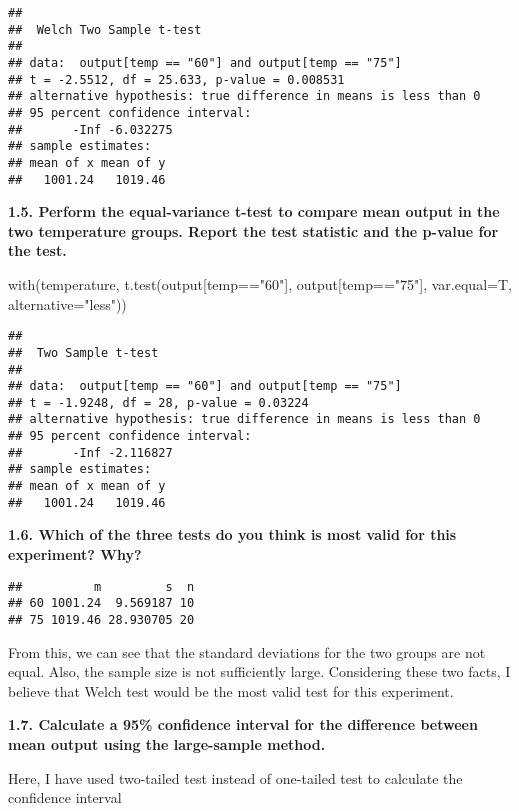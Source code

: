 \documentclass[
]{article}
\newenvironment{Shaded}{\begin{snugshade}}{\end{snugshade}}
\newcommand{\AttributeTok}[1]{\textcolor[rgb]{0.77,0.63,0.00}{#1}}
\newcommand{\FunctionTok}[1]{\textcolor[rgb]{0.00,0.00,0.00}{#1}}
\newcommand{\NormalTok}[1]{#1}
\newcommand{\SpecialCharTok}[1]{\textcolor[rgb]{0.00,0.00,0.00}{#1}}
\newcommand{\StringTok}[1]{\textcolor[rgb]{0.31,0.60,0.02}{#1}}
\begin{document}
\begin{verbatim}
## 
##  Welch Two Sample t-test
## 
## data:  output[temp == "60"] and output[temp == "75"]
## t = -2.5512, df = 25.633, p-value = 0.008531
## alternative hypothesis: true difference in means is less than 0
## 95 percent confidence interval:
##       -Inf -6.032275
## sample estimates:
## mean of x mean of y 
##   1001.24   1019.46
\end{verbatim}

\textbf{1.5. Perform the equal-variance t-test to compare mean output in
the two temperature groups. Report the test statistic and the p-value
for the test.}

\begin{Shaded}
\begin{Highlighting}[]
\FunctionTok{with}\NormalTok{(temperature, }\FunctionTok{t.test}\NormalTok{(output[temp}\SpecialCharTok{==}\StringTok{"60"}\NormalTok{], output[temp}\SpecialCharTok{==}\StringTok{"75"}\NormalTok{], }\AttributeTok{var.equal=}\NormalTok{T, }\AttributeTok{alternative=}\StringTok{"less"}\NormalTok{))}
\end{Highlighting}
\end{Shaded}

\begin{verbatim}
## 
##  Two Sample t-test
## 
## data:  output[temp == "60"] and output[temp == "75"]
## t = -1.9248, df = 28, p-value = 0.03224
## alternative hypothesis: true difference in means is less than 0
## 95 percent confidence interval:
##       -Inf -2.116827
## sample estimates:
## mean of x mean of y 
##   1001.24   1019.46
\end{verbatim}

\textbf{1.6. Which of the three tests do you think is most valid for
this experiment? Why?}

\begin{verbatim}
##          m         s  n
## 60 1001.24  9.569187 10
## 75 1019.46 28.930705 20
\end{verbatim}

From this, we can see that the standard deviations for the two groups
are not equal. Also, the sample size is not sufficiently large.
Considering these two facts, I believe that Welch test would be the most
valid test for this experiment.

\textbf{1.7. Calculate a 95\% confidence interval for the difference
between mean output using the large-sample method.}

Here, I have used two-tailed test instead of one-tailed test to
calculate the confidence interval
\end{document}
